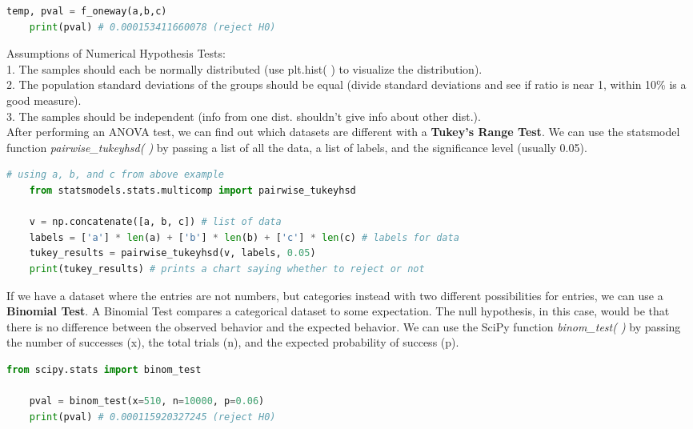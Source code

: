 \documentclass[11pt, a4paper]{article}
\begin{document}
\begin{spacing}{1.1}
\begin{lstlisting}[language=Python]
	temp, pval = f_oneway(a,b,c)
	print(pval) # 0.000153411660078 (reject H0) \end{lstlisting}\vspace*{1mm}
	Assumptions of Numerical Hypothesis Tests: \\
	1. The samples should each be normally distributed (use plt.hist( ) to visualize the distribution). \\
	2. The population standard deviations of the groups should be equal (divide standard deviations and \hspace*{4.5mm} see if ratio is near 1, within 10\% is a good measure).\\
	3. The samples should be independent (info from one dist. shouldn't give info about other dist.). \vspace*{2mm} \\
	After performing an ANOVA test, we can find out which datasets are different with a \textbf{Tukey's Range Test}. We can use the statsmodel function \textit{pairwise\_tukeyhsd( )} by passing a list of all the data, a list of labels, and the significance level (usually 0.05). 
	\begin{lstlisting}[language=Python]
	# using a, b, and c from above example
	from statsmodels.stats.multicomp import pairwise_tukeyhsd
	
	v = np.concatenate([a, b, c]) # list of data
	labels = ['a'] * len(a) + ['b'] * len(b) + ['c'] * len(c) # labels for data
	tukey_results = pairwise_tukeyhsd(v, labels, 0.05)
	print(tukey_results) # prints a chart saying whether to reject or not \end{lstlisting} \newpage
	\noindent If we have a dataset where the entries are not numbers, but categories instead with two different possibilities for entries, we can use a \textbf{Binomial Test}. A Binomial Test compares a categorical dataset to some expectation. The null hypothesis, in this case, would be that there is no difference between the observed behavior and the expected behavior. We can use the SciPy function \textit{binom\_test( )} by passing the number of successes (x), the total trials (n), and the expected probability of success (p).
	\begin{lstlisting}[language=Python]
	from scipy.stats import binom_test
	
	pval = binom_test(x=510, n=10000, p=0.06)
	print(pval) # 0.000115920327245 (reject H0)
	

\end{lstlisting}
\end{spacing}
\end{document}
